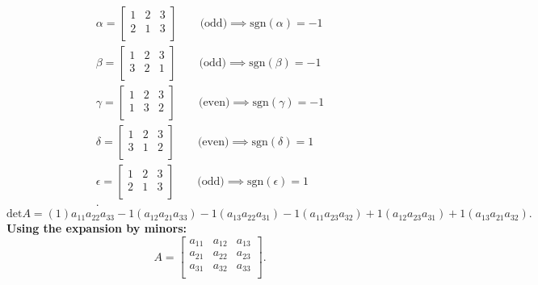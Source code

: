 \documentclass{report}
\begin{document}
              \begin{align*}
                      \alpha = \begin{bmatrix}
                      1 & 2 & 3\\
                      2 & 1 & 3\\
                      \end{bmatrix} \qquad \text{(odd)} \implies \text{sgn}\left( \alpha \right) =-1\\
    \beta= \begin{bmatrix}
                      1 & 2 & 3\\
                      3 & 2 & 1\\
                      \end{bmatrix} \qquad \text{(odd)} \implies \text{sgn}\left( \beta\right) =-1\\
\gamma= \begin{bmatrix}
                      1 & 2 & 3\\
                      1 & 3 & 2\\
                      \end{bmatrix} \qquad \text{(even)} \implies \text{sgn}\left( \gamma\right) =-1\\
\delta= \begin{bmatrix}
                      1 & 2 & 3\\
                      3 & 1 & 2\\
                      \end{bmatrix} \qquad \text{(even)} \implies \text{sgn}\left( \delta\right) =1\\
\epsilon= \begin{bmatrix}
                      1 & 2 & 3\\
                      2 & 1 & 3\\
                      \end{bmatrix} \qquad \text{(odd)} \implies \text{sgn}\left( \epsilon\right) =1\\
              .\end{align*}
              \[
                      \text{det}A = \left( 1 \right) a_{11}a_{22}a_{33} -1\left( a_{12}a_{21}a_{33} \right) -1\left( a_{13}a_{22}a_{31} \right) -1\left( a_{11}a_{23}a_{32} \right) +1\left( a_{12}a_{23}a_{31} \right) +1 \left( a_{13}a_{21}a_{32} \right) 
              .\]
              \textbf{Using the expansion by minors:} 
              \[
              A = \begin{bmatrix}
              a_{11} & a_{12} & a_{13}\\
              a_{21} & a_{22} & a_{23}\\
              a_{31} & a_{32} & a_{33}\\
              \end{bmatrix}
              .\] 
\end{document}
